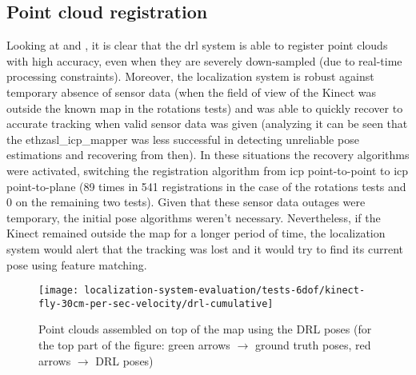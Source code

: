 


\subsection{Point cloud registration}

Looking at  and , it is clear that the \gls{drl} system is able to register point clouds with high accuracy, even when they are severely down-sampled (due to real-time processing constraints). Moreover, the localization system is robust against temporary absence of sensor data (when the field of view of the Kinect was outside the known map in the rotations tests) and was able to quickly recover to accurate tracking when valid sensor data was given (analyzing  it can be seen that the ethzasl\_icp\_mapper was less successful in detecting unreliable pose estimations and recovering from then). In these situations the recovery algorithms were activated, switching the registration algorithm from \gls{icp} point-to-point to \gls{icp} point-to-plane (89 times in 541 registrations in the case of the rotations tests and 0 on the remaining two tests). Given that these sensor data outages were temporary, the initial pose algorithms weren't necessary. Nevertheless, if the Kinect remained outside the map for a longer period of time, the localization system would alert that the tracking was lost and it would try to find its current pose using feature matching.

\begin{figure}[H]
	\centering
	\texttt{[image: localization-system-evaluation/tests-6dof/kinect-fly-30cm-per-sec-velocity/drl-cumulative]}
	\caption{Point clouds assembled on top of the map using the DRL poses (for the top part of the figure: green arrows $\rightarrow$ ground truth poses, red arrows $\rightarrow$ DRL poses)}
	\label{fig:localization-system-evaluation_kinect-fly-30cm-per-sec-velocity-drl-cumulative}
\end{figure}

